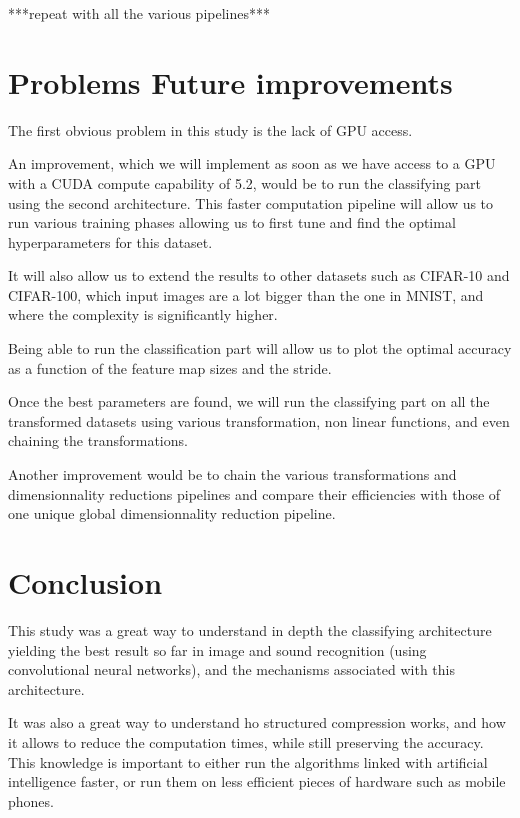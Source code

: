 \documentclass[11pt,a4paper]{article}
\begin{document}
	
	***repeat with all the various pipelines***
	
	
	\section{Problems Future improvements}
	The first obvious problem in this study is the lack of GPU access.
	
	
	An improvement, which we will implement as soon as we have access to a GPU with a CUDA compute capability of 5.2, would be to run the classifying part using the second architecture.
	This faster computation pipeline will allow us to run various training phases allowing us to first tune and find the optimal hyperparameters for this dataset.
	
	
	It will also allow us to extend the results to other datasets such as CIFAR-10 and CIFAR-100, which input images are a lot bigger than the one in MNIST, and where the complexity is significantly higher.
	
	
	Being able to run the classification part will allow us to plot the optimal accuracy as a function of the feature map sizes and the stride.
	
	
	Once the best parameters are found, we will run the classifying part on all the transformed datasets using various transformation, non linear functions, and even chaining the transformations.
	
	Another improvement would be to chain the various transformations and dimensionnality reductions pipelines and compare their efficiencies with those of one unique global dimensionnality reduction pipeline.
	
	
	\section{Conclusion}
	This study was a great way to understand in depth the classifying architecture yielding the best result so far in image and sound recognition (using convolutional neural networks), and the mechanisms associated with this architecture.
	
	
	It was also a great way to understand ho structured compression works, and how it allows to reduce the computation times, while still preserving the accuracy. This knowledge is important to either run the algorithms linked with artificial intelligence faster, or run them on less efficient pieces of hardware such as mobile phones.



	\nocite{*}
	\printbibliography
\end{document}
